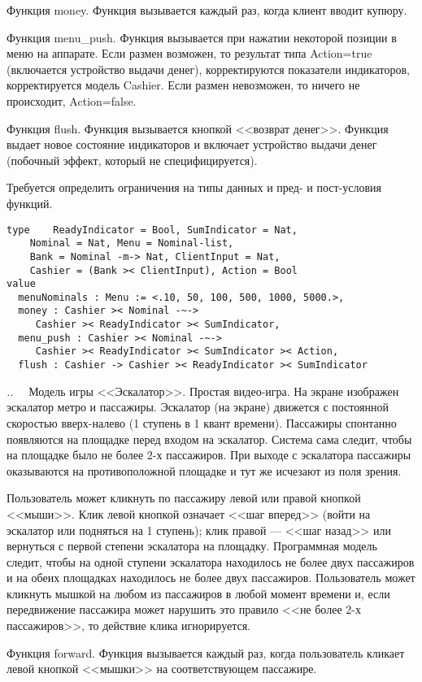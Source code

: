 \documentclass[14pt, twoside]{extreport}
\newcounter{problem_type}[chapter]
\newcounter{zadacha}[problem_type]
\newcommand{\z}{\vspace{0.5cm}\par\addtocounter{zadacha}{1}%
\textit{\arabic{chapter}.\arabic{problem_type}.\arabic{zadacha}}~~  }
\begin{document}
Функция money. Функция вызывается каждый раз, когда клиент вводит купюру.

Функция menu\_push. Функция вызывается при нажатии некоторой позиции в меню на аппарате. Если размен возможен,  то результат типа Action=true (включается устройство выдачи денег), корректируются показатели индикаторов, корректируется модель Cashier. Если размен невозможен, то ничего не происходит, Action=false.

Функция flush. Функция вызывается кнопкой <<возврат денег>>. Функция выдает новое состояние индикаторов и включает устройство выдачи денег (побочный эффект, который не специфицируется).

Требуется определить ограничения на типы данных и пред- и пост-условия функций.

\begin{lstlisting}
type	ReadyIndicator = Bool, SumIndicator = Nat,
	Nominal = Nat, Menu = Nominal-list,
	Bank = Nominal -m-> Nat, ClientInput = Nat,
	Cashier = (Bank >< ClientInput), Action = Bool
value
  menuNominals : Menu := <.10, 50, 100, 500, 1000, 5000.>,
  money : Cashier >< Nominal -~->
     Cashier >< ReadyIndicator >< SumIndicator,
  menu_push : Cashier >< Nominal -~->
     Cashier >< ReadyIndicator >< SumIndicator >< Action,
  flush : Cashier -> Cashier >< ReadyIndicator >< SumIndicator
\end{lstlisting}

\z Модель игры <<Эскалатор>>. Простая видео-игра. На экране изображен эскалатор метро и пассажиры. Эскалатор (на экране) движется с постоянной скоростью вверх-налево (1 ступень в 1 квант времени). Пассажиры спонтанно появляются на площадке перед входом на эскалатор. Система сама следит, чтобы на площадке было не более 2-х пассажиров. При выходе с эскалатора пассажиры оказываются на противоположной площадке и тут же исчезают из поля зрения.

Пользователь может кликнуть по пассажиру левой или правой кнопкой <<мыши>>. Клик левой кнопкой означает <<шаг вперед>> (войти на эскалатор или подняться на 1 ступень); клик правой --- <<шаг назад>> или вернуться с первой степени эскалатора на площадку. Программная модель следит, чтобы на одной ступени эскалатора находилось не более двух пассажиров и на обеих площадках находилось не более двух пассажиров. Пользователь может кликнуть мышкой на любом из пассажиров в любой момент времени и, если передвижение пассажира может нарушить это правило <<не более 2-х пассажиров>>, то действие клика игнорируется.	

Функция forward. Функция вызывается каждый раз, когда пользователь кликает левой кнопкой <<мышки>> на соответствующем пассажире.
\end{document}
